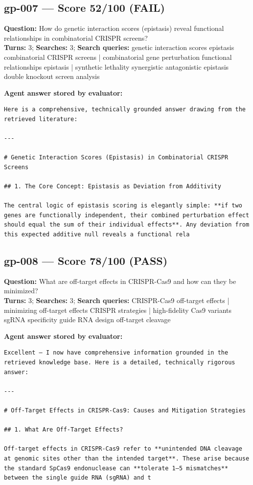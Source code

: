 \documentclass[12pt, a4paper]{article}
\begin{document}
\subsection*{gp-007 --- Score 52/100 (FAIL)}
\noindent\textbf{Question:} How do genetic interaction scores (epistasis) reveal functional relationships in combinatorial CRISPR screens?\\
\textbf{Turns:} 3; \textbf{Searches:} 3; \textbf{Search queries:} genetic interaction scores epistasis combinatorial CRISPR screens | combinatorial gene perturbation functional relationships epistasis | synthetic lethality synergistic antagonistic epistasis double knockout screen analysis

\noindent\textbf{Agent answer stored by evaluator:}
\begin{lstlisting}[numbers=none]
Here is a comprehensive, technically grounded answer drawing from the retrieved literature:

---

# Genetic Interaction Scores (Epistasis) in Combinatorial CRISPR Screens

## 1. The Core Concept: Epistasis as Deviation from Additivity

The central logic of epistasis scoring is elegantly simple: **if two genes are functionally independent, their combined perturbation effect should equal the sum of their individual effects**. Any deviation from this expected additive null reveals a functional rela
\end{lstlisting}

\subsection*{gp-008 --- Score 78/100 (PASS)}
\noindent\textbf{Question:} What are off-target effects in CRISPR-Cas9 and how can they be minimized?\\
\textbf{Turns:} 3; \textbf{Searches:} 3; \textbf{Search queries:} CRISPR-Cas9 off-target effects | minimizing off-target effects CRISPR strategies | high-fidelity Cas9 variants sgRNA specificity guide RNA design off-target cleavage

\noindent\textbf{Agent answer stored by evaluator:}
\begin{lstlisting}[numbers=none]
Excellent — I now have comprehensive information grounded in the retrieved knowledge base. Here is a detailed, technically rigorous answer:

---

# Off-Target Effects in CRISPR-Cas9: Causes and Mitigation Strategies

## 1. What Are Off-Target Effects?

Off-target effects in CRISPR-Cas9 refer to **unintended DNA cleavage at genomic sites other than the intended target**. These arise because the standard SpCas9 endonuclease can **tolerate 1–5 mismatches** between the single guide RNA (sgRNA) and t
\end{lstlisting}
\end{document}
